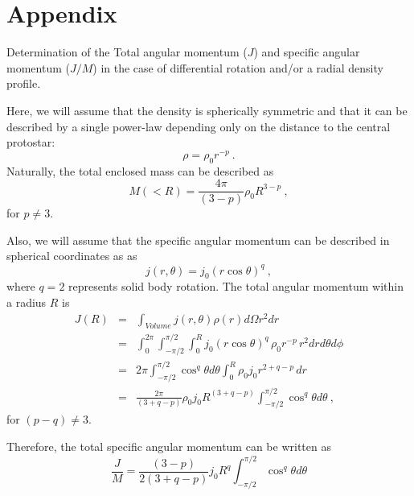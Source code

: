 \section{Appendix}
Determination of the Total angular momentum ($J$) and specific angular momentum ($J/M$) in the case of differential rotation and/or a radial density profile.

Here, we will assume that the density is spherically symmetric and that it can be described 
by a single power-law depending only on the distance to the central protostar:
\begin{equation}
\rho = \rho_0 r^{-p}~. \label{eq:density}
\end{equation}
Naturally, the total enclosed mass can be described as 
\begin{equation}
M(<R) = \frac{4\pi}{(3-p)} \rho_0 R^{3-p}~,
\end{equation}
for $p\ne 3$.

Also, we will assume that the specific angular momentum can be described in spherical coordinates as as
\begin{equation}
j(r,\theta) = j_0 ( r \cos \theta)^q~,
\end{equation}
where $q=2$ represents solid body rotation.
%
The total angular momentum within a radius $R$ is
\begin{eqnarray}
J(R) &=& \int_{Volume} j(r,\theta) \rho(r) d\Omega r^2 dr \\
&=& \int_0^{2\pi}\int_{-\pi/2}^{\pi/2}\int_0^R j_0 ( r \cos \theta)^q\, \rho_0 r^{-p}\, r^2 dr d\theta d\phi\\
&=& 2\pi \int_{-\pi/2}^{\pi/2} \cos^q \theta d\theta \int_0^R \rho_0 j_0 r^{2+q-p} \,dr \nonumber \\
&=& \frac{2\pi}{(3+q-p)}\rho_0 j_0 R^{(3+q-p)} \int_{-\pi/2}^{\pi/2} \cos^q \theta d\theta~,
\end{eqnarray}
for $(p-q)\ne 3$.

Therefore, the total specific angular momentum can be written as
\begin{equation}
\frac{J}{M} = \frac{(3-p)}{2(3+q-p)} j_0 R^{q} 
\int_{-\pi/2}^{\pi/2} \cos^q \theta d\theta 
\end{equation}
  